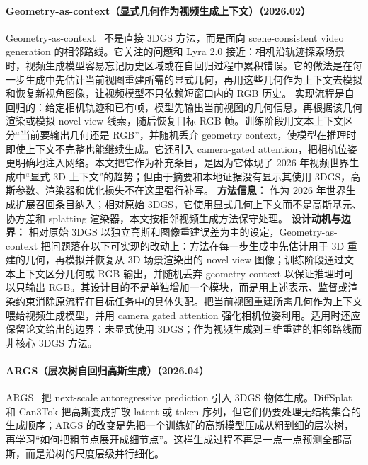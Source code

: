 \paragraph{Geometry-as-context（显式几何作为视频生成上下文）（2026.02）}
Geometry-as-context~\cite{2602_21929} 不是直接 3DGS 方法，而是面向 scene-consistent video generation 的相邻路线。它关注的问题和 Lyra 2.0 接近：相机沿轨迹探索场景时，视频生成模型容易忘记历史区域或在自回归过程中累积错误。它的做法是在每一步生成中先估计当前视图重建所需的显式几何，再用这些几何作为上下文去模拟和恢复新视角图像，让视频模型不只依赖短窗口内的 RGB 历史。
实现流程是自回归的：给定相机轨迹和已有帧，模型先输出当前视图的几何信息，再根据该几何渲染或模拟 novel-view 线索，随后恢复目标 RGB 帧。训练阶段用文本上下文区分“当前要输出几何还是 RGB”，并随机丢弃 geometry context，使模型在推理时即使上下文不完整也能继续生成。它还引入 camera-gated attention，把相机位姿更明确地注入网络。本文把它作为补充条目，是因为它体现了 2026 年视频世界生成中“显式 3D 上下文”的趋势；但由于摘要和本地证据没有显示其使用 3DGS，高斯参数、渲染器和优化损失不在这里强行补写。
\textbf{方法信息：} 作为 2026 年世界生成扩展召回条目纳入；相对原始 3DGS，它使用显式几何上下文而不是高斯基元、协方差和 splatting 渲染器，本文按相邻视频生成方法保守处理。
\textbf{设计动机与边界：} 相对原始 3DGS 以独立高斯和图像重建误差为主的设定，Geometry-as-context 把问题落在以下可实现的改动上：方法在每一步生成中先估计用于 3D 重建的几何，再模拟并恢复从 3D 场景渲染出的 novel view 图像；训练阶段通过文本上下文区分几何或 RGB 输出，并随机丢弃 geometry context 以保证推理时可以只输出 RGB。其设计目的不是单独增加一个模块，而是用上述表示、监督或渲染约束消除原流程在目标任务中的具体失配。把当前视图重建所需几何作为上下文喂给视频生成模型，并用 camera gated attention 强化相机位姿利用。适用时还应保留论文给出的边界：未显式使用 3DGS；作为视频生成到三维重建的相邻路线而非核心 3DGS 方法。
\paragraph{ARGS（层次树自回归高斯生成）（2026.04）}
ARGS~\cite{2604_00494} 把 next-scale autoregressive prediction 引入 3DGS 物体生成。DiffSplat 和 Can3Tok 把高斯变成扩散 latent 或 token 序列，但它们仍要处理无结构集合的生成顺序；ARGS 的改变是先把一个训练好的高斯模型压成从粗到细的层次树，再学习“如何把粗节点展开成细节点”。这样生成过程不再是一点一点预测全部高斯，而是沿树的尺度层级并行细化。

